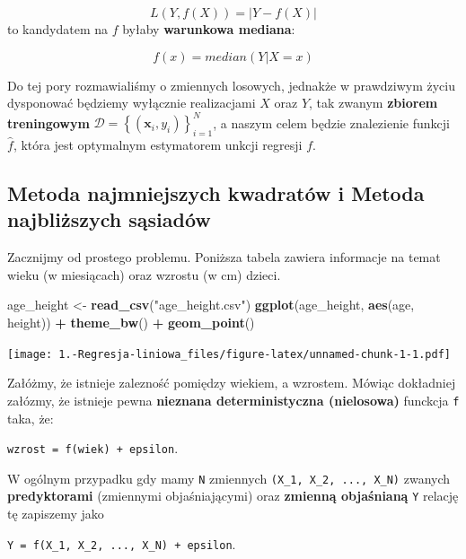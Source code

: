 \documentclass[
]{article}
\newenvironment{Shaded}{\begin{snugshade}}{\end{snugshade}}
\newcommand{\KeywordTok}[1]{\textcolor[rgb]{0.13,0.29,0.53}{\textbf{#1}}}
\newcommand{\NormalTok}[1]{#1}
\newcommand{\OperatorTok}[1]{\textcolor[rgb]{0.81,0.36,0.00}{\textbf{#1}}}
\newcommand{\StringTok}[1]{\textcolor[rgb]{0.31,0.60,0.02}{#1}}
\begin{document}
\[
L(Y, f(X)) = |Y -  f(X)|
\] to kandydatem na \(f\) byłaby \textbf{warunkowa mediana}:

\[
f(x) = median(Y| X = x)
\]

Do tej pory rozmawialiśmy o zmiennych losowych, jednakże w prawdziwym
życiu dysponować będziemy wyłącznie realizacjami \(X\) oraz \(Y\), tak
zwanym \textbf{zbiorem treningowym}
\(\mathcal{D}=\left\{\left(\mathbf{x}_{i}, y_{i}\right)\right\}_{i=1}^{N}\),
a naszym celem będzie znalezienie funkcji \(\hat{f}\), która jest
optymalnym estymatorem unkcji regresji \(f\).

\hypertarget{metoda-najmniejszych-kwadratuxf3w-i-metoda-najbliux17cszych-sux105siaduxf3w}{%
\subsection{Metoda najmniejszych kwadratów i Metoda najbliższych
sąsiadów}\label{metoda-najmniejszych-kwadratuxf3w-i-metoda-najbliux17cszych-sux105siaduxf3w}}

Zacznijmy od prostego problemu. Poniższa tabela zawiera informacje na
temat wieku (w miesiącach) oraz wzrostu (w cm) dzieci.

\begin{Shaded}
\begin{Highlighting}[]
\NormalTok{age\_height \textless{}{-}}\StringTok{ }\KeywordTok{read\_csv}\NormalTok{(}\StringTok{"age\_height.csv"}\NormalTok{)}
\KeywordTok{ggplot}\NormalTok{(age\_height, }\KeywordTok{aes}\NormalTok{(age, height)) }\OperatorTok{+}\StringTok{ }\KeywordTok{theme\_bw}\NormalTok{() }\OperatorTok{+}\StringTok{ }\KeywordTok{geom\_point}\NormalTok{()}
\end{Highlighting}
\end{Shaded}

\texttt{[image: 1.-Regresja-liniowa\_files/figure-latex/unnamed-chunk-1-1.pdf]}

Załóżmy, że istnieje zalezność pomiędzy wiekiem, a wzrostem. Mówiąc
dokładniej załózmy, że istnieje pewna \textbf{nieznana deterministyczna
(nielosowa)} funckcja \texttt{f} taka, że:

\texttt{wzrost\ =\ f(wiek)\ +\ epsilon}.

W ogólnym przypadku gdy mamy \texttt{N} zmiennych
\texttt{(X\_1,\ X\_2,\ ...,\ X\_N)} zwanych \textbf{predyktorami}
(zmiennymi objaśniającymi) oraz \textbf{zmienną objaśnianą} \texttt{Y}
relację tę zapiszemy jako

\texttt{Y\ =\ f(X\_1,\ X\_2,\ ...,\ X\_N)\ +\ epsilon}.
\end{document}
